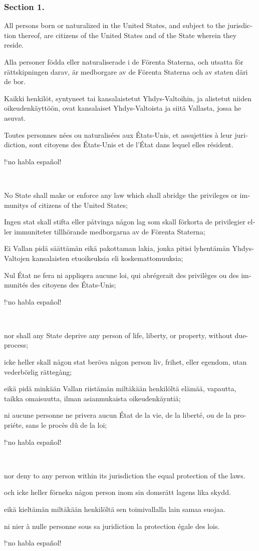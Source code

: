 \documentclass[a4paper,landscape,10pt]{article}
\newcommand{\tblock}[5]{\noindent\begin{minipage}[t]{0.18\textwidth}\foreignlanguage{english}{#1}\end{minipage}\hskip 0.025\textwidth\begin{minipage}[t]{0.18\textwidth}\foreignlanguage{swedish}{#2}\end{minipage}\hskip 0.025\textwidth\begin{minipage}[t]{0.18\textwidth}\foreignlanguage{finnish}{#3}\end{minipage}\hskip 0.025\textwidth\begin{minipage}[t]{0.18\textwidth}\foreignlanguage{french}{#4}\end{minipage}\hskip 0.025\textwidth\begin{minipage}[t]{0.18\textwidth}\foreignlanguage{spanish}{#5}\end{minipage}}
\begin{document}
\subsubsection*{Section 1.}
\tblock
{All persons born or naturalized in the United States, and subject to the jurisdiction thereof, are citizens of the United States and of the State wherein they reside.}
{Alla personer födda eller naturaliserade i de Förenta Staterna, och utsatta för rättskipningen darav, är medborgare av de Förenta Staterna och av staten däri de bor.}
{Kaikki henkilöt, syntyneet tai kansalaistetut Yhdys-Valtoihin, ja alistetut niiden oikeudenkäyttöön, ovat kansalaiset Yhdys-Valtoista ja siitä Vallasta, jossa he asuvat.}
{Toutes personnes nées ou naturalisées aux États-Unis, et assujetties à leur juridiction, sont citoyens des États-Unis et de l'État dans lequel elles résident.}
{!`no habla español!}

~

\tblock
{No State shall make or enforce any law which shall \gls{abridge} the \glspl{privilege} or \glspl{immunity} of citizens of the United States;}
{Ingen stat skall stifta eller påtvinga någon lag som skall förkorta de privilegier eller immuniteter tillhörande medborgarna av de Förenta Staterna;}
{Ei Vallan pidä säättämän eikä pakottaman lakia, jonka pitisi lyhentämän Yhdys-Valtojen kansalaisten etuoikeuksia eli koskemattomuuksia;}
{Nul État ne fera ni appliqera aucune loi, qui abrégerait des privilèges ou des immunités des citoyens des États-Unis;}
{!`no habla español!}

~

\tblock
{nor shall any State deprive any person of life, liberty, or property, without \gls{due-process};}
{icke heller skall någon stat beröva någon person liv, frihet, eller egendom, utan vederbörlig rättegång;}
{eikä pidä minkään Vallan riistämän miltäkään henkilöltä elämää, vapautta, taikka omaisuutta, ilman asianmukaista oikeudenkäyntiä;}
{ni aucune personne ne privera aucun État de la vie, de la liberté, ou de la propriéte, sans le procès dû de la loi;}
{!`no habla español!}

	
~

\tblock
{nor deny to any person within its jurisdiction the equal protection of the laws.}
{och icke heller förneka någon person inom sin domsrätt lagens lika skydd.}
{eikä kieltämän miltäkään henkilöltä sen toimivallalla lain samaa suojaa.}
{ni nier à nulle personne sous sa juridiction la protection égale des lois.}
{!`no habla español!}

~
		
\end{document}

